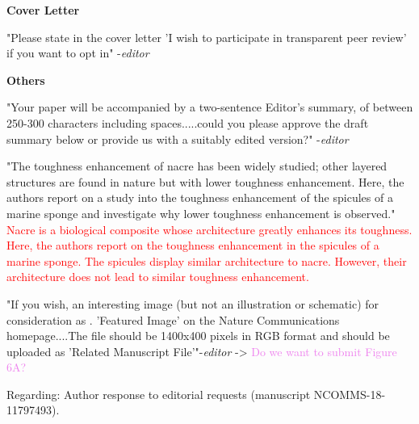 \documentclass[11pt,letterpaper]{report}
\newcommand{\cmark}{\ding{51}}%
\newcommand{\done}{\rlap{$\square$}{\raisebox{2pt}{\large\hspace{1pt}\cmark}}%
\hspace{-2.5pt}}
\begin{document}
\textbf{Cover Letter}
\begin{todolist}
\item[\done] "Please state in the cover letter 'I wish to participate in transparent peer review' if you want to opt in" -\textit{editor}
\end{todolist}

\textbf{Others}
\begin{todolist}
\item[\done] "Your paper will be accompanied by a two-sentence Editor's summary, of between 250-300 characters including spaces.....could you please approve the draft summary below or provide us with a suitably edited version?" -\textit{editor}
\begin{todolist}
    \item[\done] "The toughness enhancement of nacre has been widely studied; other layered structures are found in nature but with lower toughness enhancement. Here, the authors report on a study into the toughness enhancement of the spicules of a marine sponge and investigate why lower toughness enhancement is observed." \textcolor{red}{Nacre is a biological composite whose architecture greatly enhances its toughness. Here, the authors report on the toughness enhancement in the spicules of a marine sponge. The spicules display similar architecture to nacre. However, their architecture does not lead to similar toughness enhancement.}
\end{todolist}
\item[\done] "If you wish, an interesting image (but not an illustration or schematic) for consideration as . 'Featured Image' on the Nature Communications homepage....The file should be 1400x400 pixels in RGB format and should be uploaded as 'Related Manuscript File'"-\textit{editor} -> \textcolor{violet}{Do we want to submit Figure 6A?}
\end{todolist}


\newpage
\setcounter{page}{1}
\thispagestyle{fancy}
\phantom{x}
\vspace{4em}


Regarding: Author response to editorial requests (manuscript NCOMMS-18-11797493).
\end{document}
